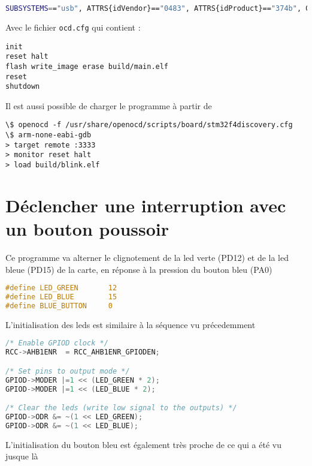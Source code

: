 \documentclass{FicheLecture}
\begin{document}
  \begin{lstlisting}[language=sh]
SUBSYSTEMS=="usb", ATTRS{idVendor}=="0483", ATTRS{idProduct}=="374b", GROUP="am", MODE="0660"
  \end{lstlisting}

Avec le fichier \texttt{ocd.cfg} qui contient :

\begin{lstlisting}
init
reset halt
flash write_image erase build/main.elf 
reset 
shutdown
\end{lstlisting}

Il est aussi possible de charger le programme à partir de 

\begin{lstlisting}
\$ openocd -f /usr/share/openocd/scripts/board/stm32f4discovery.cfg
\$ arm-none-eabi-gdb
> target remote :3333
> monitor reset halt
> load build/blink.elf
\end{lstlisting}

\section{Déclencher une interruption avec un bouton poussoir}

Ce programme va alterner le clignotement de la led verte (PD12) et de la led bleue (PD15) de la carte, en réponse à la pression du bouton bleu (PA0)

\begin{lstlisting}[language=C]
#define LED_GREEN       12
#define LED_BLUE        15
#define BLUE_BUTTON     0
\end{lstlisting}

L'initialisation des leds est similaire à la séquence vu précedemment 

\begin{lstlisting}[language=C]
/* Enable GPIOD clock */
RCC->AHB1ENR  = RCC_AHB1ENR_GPIODEN;

/* Set pins to output mode */
GPIOD->MODER |=1 << (LED_GREEN * 2);
GPIOD->MODER |=1 << (LED_BLUE * 2);

/* Clear the leds (write low signal to the outputs) */
GPIOD->ODR &= ~(1 << LED_GREEN);
GPIOD->ODR &= ~(1 << LED_BLUE);
\end{lstlisting}

L'initialisation du bouton bleu est également très proche de ce qui a été vu jusque là
\end{document}

